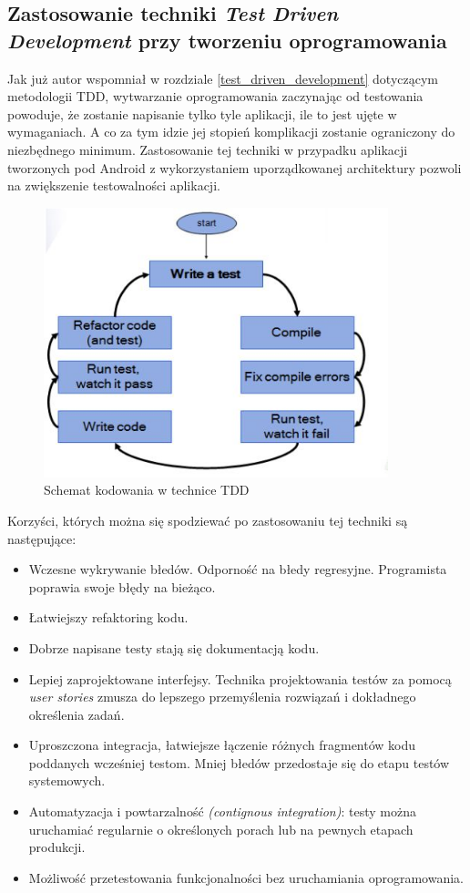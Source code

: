 \subsection{Zastosowanie techniki \textit{Test Driven Development} przy tworzeniu oprogramowania}
Jak już autor wspomniał w rozdziale \ref{test_driven_development} dotyczącym metodologii TDD, wytwarzanie oprogramowania zaczynając od testowania powoduje, że zostanie napisanie tylko tyle aplikacji, ile to jest ujęte w wymaganiach. A co za tym idzie jej stopień komplikacji zostanie ograniczony do niezbędnego minimum. Zastosowanie tej techniki w przypadku aplikacji tworzonych pod Android z wykorzystaniem uporządkowanej architektury pozwoli na zwiększenie testowalności aplikacji. 

\begin{figure}[!htb]
    \centering
    \includegraphics[width=10cm]{imgs/ch4_tdd.jpg}
    \caption
{Schemat kodowania w technice TDD}
    \label{fig:tdd_schema}
\end{figure} 

Korzyści, których można się spodziewać po zastosowaniu tej techniki są następujące:

\begin{itemize}
\item
Wczesne wykrywanie błedów. Odporność na błedy regresyjne. Programista poprawia swoje błędy na bieżąco.
\item
Łatwiejszy refaktoring kodu.
\item
Dobrze napisane testy stają się dokumentacją kodu.
\item
Lepiej zaprojektowane interfejsy. Technika projektowania testów za pomocą \textit{user stories} zmusza do lepszego przemyślenia rozwiązań i dokładnego określenia zadań. 
\item
Uproszczona integracja, łatwiejsze łączenie różnych fragmentów kodu poddanych wcześniej testom. Mniej błedów przedostaje się do etapu testów systemowych.
\item
Automatyzacja i powtarzalność \textit{(contignous integration)}: testy można uruchamiać regularnie o określonych porach lub na pewnych etapach produkcji. 
\item
Możliwość przetestowania funkcjonalności bez uruchamiania oprogramowania.
\end{itemize}

